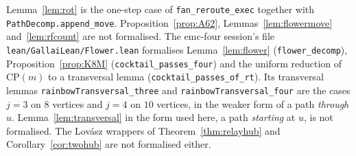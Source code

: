 \documentclass[11pt]{amsart}
\theoremstyle{definition}
\begin{document}
Lemma~\ref{lem:rot} is the one-step case of \texttt{fan\_reroute\_exec} together with
\texttt{PathDecomp.append\_move}. Proposition~\ref{prop:A62}, Lemmas~\ref{lem:flowermove}
and~\ref{lem:rfcount} are not formalised. The emc-four session's file
\texttt{lean/GallaiLean/Flower.lean} formalises Lemma~\ref{lem:flower} (\texttt{flower\_decomp}),
Proposition~\ref{prop:K8M} (\texttt{cocktail\_passes\_four}) and the uniform reduction of
$\mathrm{CP}(m)$ to a transversal lemma (\texttt{cocktail\_passes\_of\_rt}). Its transversal
lemmas \texttt{rainbowTransversal\_three} and \texttt{rainbowTransversal\_four} are the cases
$j=3$ on $8$ vertices and $j=4$ on $10$ vertices, in the weaker form of a path \emph{through} $u$.
Lemma~\ref{lem:transversal} in the form used here, a path \emph{starting} at $u$, is not
formalised.
The Lov\'asz wrappers of Theorem~\ref{thm:relayhub} and Corollary~\ref{cor:twohub} are not formalised either.
\end{document}

